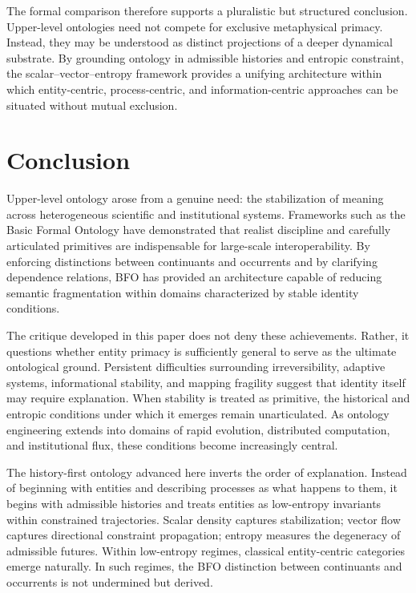 \documentclass[12pt]{article}
\begin{document}
The formal comparison therefore supports a pluralistic but structured conclusion. Upper-level ontologies need not compete for exclusive metaphysical primacy. Instead, they may be understood as distinct projections of a deeper dynamical substrate. By grounding ontology in admissible histories and entropic constraint, the scalar–vector–entropy framework provides a unifying architecture within which entity-centric, process-centric, and information-centric approaches can be situated without mutual exclusion.

\section{Conclusion}

Upper-level ontology arose from a genuine need: the stabilization of meaning across heterogeneous scientific and institutional systems. Frameworks such as the Basic Formal Ontology have demonstrated that realist discipline and carefully articulated primitives are indispensable for large-scale interoperability. By enforcing distinctions between continuants and occurrents and by clarifying dependence relations, BFO has provided an architecture capable of reducing semantic fragmentation within domains characterized by stable identity conditions.

The critique developed in this paper does not deny these achievements. Rather, it questions whether entity primacy is sufficiently general to serve as the ultimate ontological ground. Persistent difficulties surrounding irreversibility, adaptive systems, informational stability, and mapping fragility suggest that identity itself may require explanation. When stability is treated as primitive, the historical and entropic conditions under which it emerges remain unarticulated. As ontology engineering extends into domains of rapid evolution, distributed computation, and institutional flux, these conditions become increasingly central.

The history-first ontology advanced here inverts the order of explanation. Instead of beginning with entities and describing processes as what happens to them, it begins with admissible histories and treats entities as low-entropy invariants within constrained trajectories. Scalar density captures stabilization; vector flow captures directional constraint propagation; entropy measures the degeneracy of admissible futures. Within low-entropy regimes, classical entity-centric categories emerge naturally. In such regimes, the BFO distinction between continuants and occurrents is not undermined but derived.
\end{document}
